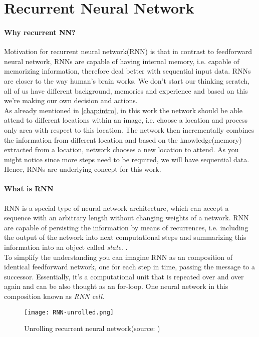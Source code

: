\section{Recurrent Neural Network}

\paragraph{Why recurrent NN?} Motivation for recurrent neural network(RNN) is that
in contrast to feedforward neural network, RNNs are capable of having internal memory,
i.e. capable of memorizing information, therefore deal better with sequential input data.
RNNs are closer to the way human's brain works. We don't start our thinking scratch,
all of us have different background, memories and experience and based on this
we're making our own decision and actions. \\
As already mentioned in \autoref{chap:intro}, in this work
the network should be able attend to different locations within an image, i.e.
choose a location and process only area with respect to this location. The network then
incrementally combines the information from different location and based
on the knowledge(memory) extracted from a location, network chooses a new location to
attend. As you might notice since more steps need to be required, we will have sequential
data. Hence, RNNs are underlying concept for this work.

\paragraph{What is RNN} RNN is a special type of neural network architecture, which can
accept a sequence with an arbitrary length without changing weights of a network.
RNN are capable of persisting the information by means of recurrences, i.e. including
the output of the network into next computational steps and summarizing this information
into an object called \emph{state}.
 \cite{Kriesel2007NeuralNetworks}.
\\
To simplify the understanding you can imagine RNN as an composition of identical
feedforward network, one for each step in time, passing the message to a successor.
Essentially, it's a computational unit that is repeated over and over again and
can be also thought as an for-loop.
One neural network in this composition known as \emph{RNN cell}.

\begin{figure}[H]
	\texttt{[image: RNN-unrolled.png]}
	\caption{Unrolling recurrent neural network(source: \cite{ColahChristopher2015})}
	\label{img:rnn_unrolled}
\end{figure}

